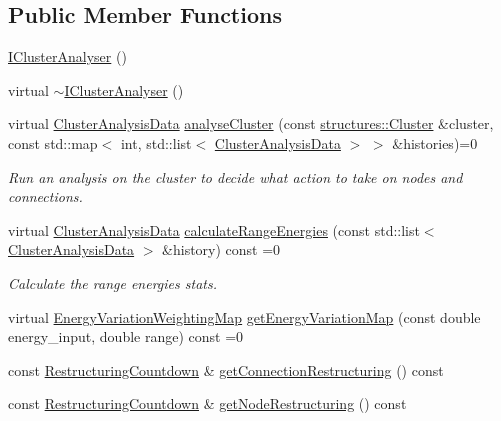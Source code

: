 \subsection*{\-Public \-Member \-Functions}
\begin{DoxyCompactItemize}
\item 
\hyperlink{classcryomesh_1_1manipulators_1_1IClusterAnalyser_aa3b46d3be5c9ab4eeaccd95316412b6a}{\-I\-Cluster\-Analyser} ()
\item 
virtual \hyperlink{classcryomesh_1_1manipulators_1_1IClusterAnalyser_af75850be2d49a54411cf5c9274c1ec76}{$\sim$\-I\-Cluster\-Analyser} ()
\item 
virtual \hyperlink{classcryomesh_1_1manipulators_1_1ClusterAnalysisData}{\-Cluster\-Analysis\-Data} \hyperlink{classcryomesh_1_1manipulators_1_1IClusterAnalyser_a0b8594c4b41ed14d5a94d191d1ab11fd}{analyse\-Cluster} (const \hyperlink{classcryomesh_1_1structures_1_1Cluster}{structures\-::\-Cluster} \&cluster, const std\-::map$<$ int, std\-::list$<$ \hyperlink{classcryomesh_1_1manipulators_1_1ClusterAnalysisData}{\-Cluster\-Analysis\-Data} $>$ $>$ \&histories)=0
\begin{DoxyCompactList}\small\item\em \-Run an analysis on the cluster to decide what action to take on nodes and connections. \end{DoxyCompactList}\item 
virtual \hyperlink{classcryomesh_1_1manipulators_1_1ClusterAnalysisData}{\-Cluster\-Analysis\-Data} \hyperlink{classcryomesh_1_1manipulators_1_1IClusterAnalyser_a1f666c2ccf0a6564510c8b4f062e2e21}{calculate\-Range\-Energies} (const std\-::list$<$ \hyperlink{classcryomesh_1_1manipulators_1_1ClusterAnalysisData}{\-Cluster\-Analysis\-Data} $>$ \&history) const =0
\begin{DoxyCompactList}\small\item\em \-Calculate the range energies stats. \end{DoxyCompactList}\item 
virtual \hyperlink{structcryomesh_1_1manipulators_1_1IClusterAnalyser_1_1EnergyVariationWeightingMap}{\-Energy\-Variation\-Weighting\-Map} \hyperlink{classcryomesh_1_1manipulators_1_1IClusterAnalyser_a27db139b4aa43f0c008de165d2f22f5b}{get\-Energy\-Variation\-Map} (const double energy\-\_\-input, double range) const =0
\item 
const \hyperlink{structcryomesh_1_1manipulators_1_1IClusterAnalyser_1_1RestructuringCountdown}{\-Restructuring\-Countdown} \& \hyperlink{classcryomesh_1_1manipulators_1_1IClusterAnalyser_af8eb711949e1d69bbe31b564ff9ab340}{get\-Connection\-Restructuring} () const 
\item 
const \hyperlink{structcryomesh_1_1manipulators_1_1IClusterAnalyser_1_1RestructuringCountdown}{\-Restructuring\-Countdown} \& \hyperlink{classcryomesh_1_1manipulators_1_1IClusterAnalyser_a72da7d8f63441671b8ebd1f4cd994347}{get\-Node\-Restructuring} () const 
\end{DoxyCompactItemize}

